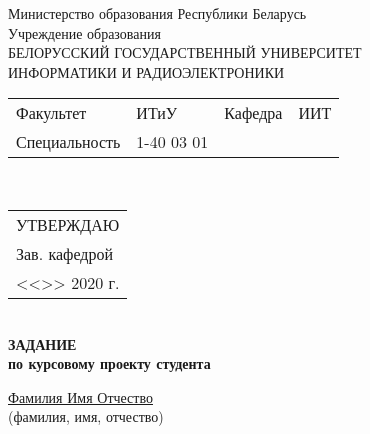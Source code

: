{
  \thispagestyle{empty}
  \setlength{\parindent}{0em}

  \newcommand{\lineunderscore}{\uline{\hspace*{\fill}}}

  \begin{center}
    Министерство образования Республики Беларусь\\
    Учреждение образования\\
    БЕЛОРУССКИЙ ГОСУДАРСТВЕННЫЙ УНИВЕРСИТЕТ \\
    ИНФОРМАТИКИ И РАДИОЭЛЕКТРОНИКИ\\[1em]
  

  \begin{minipage}{\textwidth}
    \begin{flushleft}
      \begin{tabular}{ p{}p{}p{}p{} @{} }
        Факультет & ИТиУ & Кафедра & ИИТ \\
        Специальность   & 1-40 03 01 %
      \end{tabular}
    \end{flushleft}
  \end{minipage}\\[1em]

  \begin{minipage}{\textwidth}
    \begin{flushright}
      \begin{tabular}{p{}}
        УТВЕРЖДАЮ \\[0.5em]
        \underline{\hspace*{6em}} Зав. кафедрой \\
        
        <<\underline{\hspace*{4ex}}>> \underline{\hspace*{7em}} 2020 г.
      \end{tabular}
    \end{flushright}
  \end{minipage}\\[1em]

  \textbf{ЗАДАНИЕ} \\
  \textbf{по курсовому проекту студента}

  \lineunderscore\uline{Фамилия Имя Отчество}\lineunderscore \\
  {\small (фамилия, имя, отчество) }


\end{center}}
